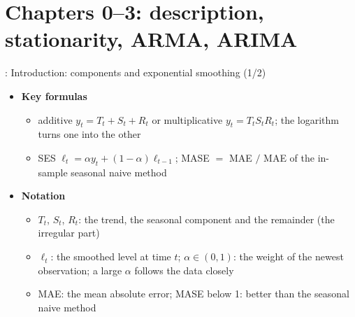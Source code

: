 \section{Chapters 0--3: description, stationarity, ARMA, ARIMA}

\begin{frame}{: Introduction: components and exponential smoothing (1/2)}
\itemsize{\footnotesize}
\begin{itemize}
    \item \textbf{Key formulas}
    \begin{itemize}
        \item additive $y_t = T_t + S_t + R_t$ or multiplicative $y_t = T_t S_t R_t$; the logarithm turns one into the other
        \item SES $\ell_t = \alpha y_t + (1 - \alpha)\ell_{t-1}$; MASE $=$ MAE $/$ MAE of the in-sample seasonal naive method
    \end{itemize}
    \item \textbf{Notation}
    \begin{itemize}
        \item $T_t$, $S_t$, $R_t$: the trend, the seasonal component and the remainder (the irregular part)
        \item $\ell_t$: the smoothed level at time $t$; $\alpha \in (0, 1)$: the weight of the newest observation; a large $\alpha$ follows the data closely
        \item MAE: the mean absolute error; MASE below 1: better than the seasonal naive method
    \end{itemize}
\end{itemize}
\end{frame}

